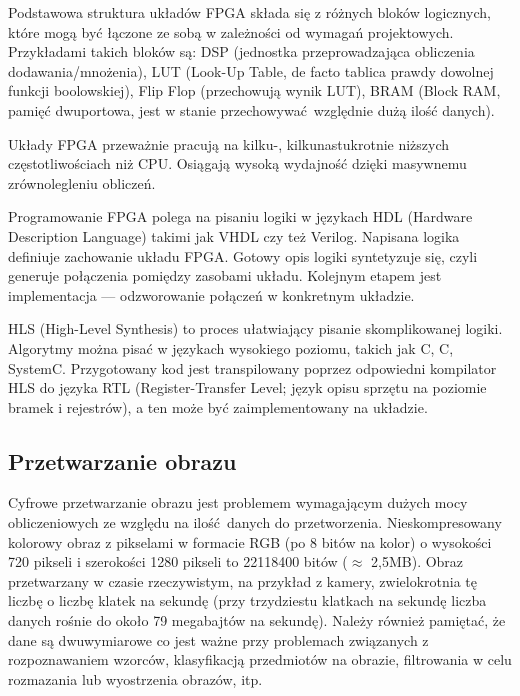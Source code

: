\documentclass[12pt, oneside, a4paper]{article}
\def\CPP{{C\nolinebreak[4]\hspace{-.05em}\raisebox{.4ex}{\tiny\bf ++}}}
\begin{document}
Podstawowa struktura układów FPGA składa się z różnych bloków logicznych,
które mogą być łączone ze sobą w zależności od wymagań projektowych.
Przykładami takich bloków są:
DSP (jednostka przeprowadzająca obliczenia dodawania/mnożenia),
LUT (Look-Up Table, de facto tablica prawdy dowolnej funkcji boolowskiej),
Flip Flop (przechowują wynik LUT), BRAM (Block RAM, pamięć dwuportowa,
jest w stanie przechowywać względnie dużą ilość danych).

Układy FPGA przeważnie pracują na kilku-, kilkunastukrotnie niższych
częstotliwościach niż CPU. Osiągają wysoką wydajność
dzięki masywnemu zrównolegleniu obliczeń.

Programowanie FPGA polega na pisaniu logiki
w językach HDL (Hardware Description Language) takimi jak VHDL 
czy też Verilog. Napisana logika definiuje zachowanie układu FPGA.
Gotowy opis logiki syntetyzuje się, czyli generuje połączenia pomiędzy
zasobami układu. Kolejnym etapem jest implementacja --- odzworowanie
połączeń w konkretnym układzie.
 
HLS (High-Level Synthesis) to proces ułatwiający pisanie skomplikowanej
logiki. Algorytmy można pisać w językach wysokiego poziomu, takich jak
C, \CPP, SystemC. Przygotowany kod jest transpilowany poprzez odpowiedni
kompilator HLS do języka RTL (Register-Transfer Level; język opisu sprzętu
na poziomie bramek i rejestrów), a ten może być zaimplementowany na układzie.

\subsection{Przetwarzanie obrazu}
Cyfrowe przetwarzanie obrazu jest problemem wymagającym dużych mocy
obliczeniowych ze względu na ilość danych do przetworzenia. Nieskompresowany
kolorowy obraz z pikselami w formacie RGB (po 8 bitów na kolor) o wysokości
720 pikseli i szerokości 1280 pikseli to 22118400 bitów (\(\approx \) 2,5MB). Obraz
przetwarzany w czasie rzeczywistym, na przykład z kamery, zwielokrotnia tę
liczbę o liczbę klatek na sekundę (przy trzydziestu klatkach na sekundę liczba
danych rośnie do około 79 megabajtów na sekundę). Należy również pamiętać, że
dane są dwuwymiarowe co jest ważne przy problemach związanych z rozpoznawaniem
wzorców, klasyfikacją przedmiotów na obrazie, filtrowania w celu rozmazania lub
wyostrzenia obrazów, itp.
\end{document}
